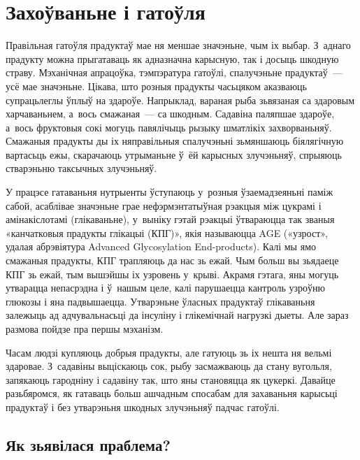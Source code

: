 \chapter{Захоўваньне і гатоўля}

Правільная гатоўля прадуктаў мае ня меншае значэньне, чым іх выбар. З~аднаго прадукту можна прыгатаваць як адназначна карысную, так і досыць шкодную страву. Мэханічная апрацоўка, тэмпэратура гатоўлі, спалучэньне прадуктаў~--- усё мае значэньне. Цікава, што розныя прадукты часьцяком аказваюць супрацьлеглы ўплыў на здароўе. Напрыклад, вараная рыба зьвязаная са здаровым харчаваньнем, а~вось смажаная~--- са шкодным. Садавіна паляпшае здароўе, а~вось фруктовыя сокі могуць павялічыць рызыку шматлікіх захворваньняў. Смажаныя прадукты ды іх няправільныя спалучэньні зьмяншаюць біялягічную вартасьць ежы, скарачаюць утрыманьне ў~ёй карысных злучэньняў, спрыяюць стварэньню таксычных злучэньняў.


У працэсе гатаваньня нутрыенты ўступаюць у~розныя ўзаемадзеяньні паміж сабой, асаблівае значэньне грае нефэрмэнтатыўная рэакцыя між цукрамі і амінакіслотамі (глікаваньне), у~выніку гэтай рэакцыі ўтвараюцца так званыя «канчатковыя прадукты глікацыі (КПГ)», якія называюцца AGE («узрост», удалая абрэвіятура Advanced Glycosylation End-products). Калі мы ямо смажаныя прадукты, КПГ трапляюць да нас зь ежай. Чым больш вы зьядаеце КПГ зь ежай, тым вышэйшы іх узровень у~крыві. Акрамя гэтага, яны могуць утварацца непасрэдна і ў~нашым целе, калі парушаецца кантроль узроўню глюкозы і яна падвышаецца. Утварэньне ўласных прадуктаў глікаваньня залежыць ад адчувальнасьці да інсуліну і глікемічнай нагрузкі дыеты. Але зараз размова пойдзе пра першы мэханізм.

Часам людзі купляюць добрыя прадукты, але гатуюць зь іх нешта ня вельмі здаровае. З~садавіны выціскаюць сок, рыбу засмажваюць да стану вугольля, запякаюць гародніну і садавіну так, што яны становяцца як цукеркі. Давайце разьбяромся, як гатаваць больш ашчадным спосабам для захаваньня карысьці прадуктаў і без утварэньня шкодных злучэньняў падчас гатоўлі.

\section{Як зьявілася праблема?}

